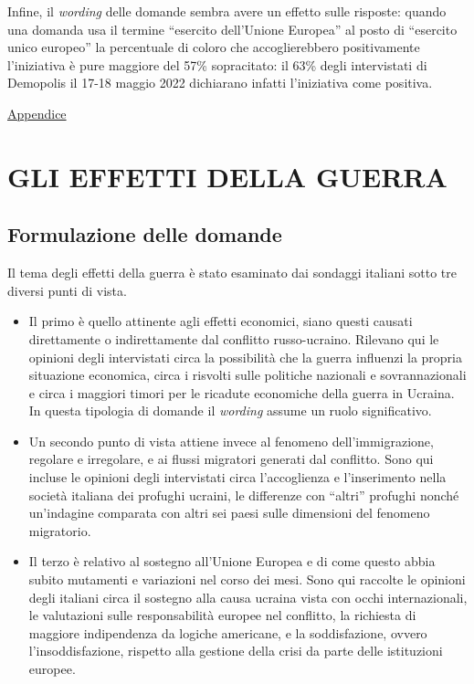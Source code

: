\documentclass[
]{book}
\begin{document}
Infine, il \emph{wording} delle domande sembra avere un effetto sulle risposte: quando una domanda usa il termine ``esercito dell'Unione Europea'' al posto di ``esercito unico europeo'' la percentuale di coloro che accoglierebbero positivamente l'iniziativa è pure maggiore del 57\% sopracitato: il 63\% degli intervistati di Demopolis il 17-18 maggio 2022 dichiarano infatti l'iniziativa come positiva.

\href{https://github.com/LucianaFazio/Ucrania/blob/main/PDF_Appendice/V.\%20Cosa\%20dobbiamo\%20possiamo\%20fare\%20noi\%20v.5.pdf}{Appendice}

\hypertarget{gli-effetti-della-guerra}{%
\chapter{GLI EFFETTI DELLA GUERRA}\label{gli-effetti-della-guerra}}

\hypertarget{formulazione-delle-domande-4}{%
\section{Formulazione delle domande}\label{formulazione-delle-domande-4}}

Il tema degli effetti della guerra è stato esaminato dai sondaggi italiani sotto tre diversi punti di vista.

\begin{itemize}
\item
  Il primo è quello attinente agli effetti economici, siano questi causati direttamente o indirettamente dal conflitto russo-ucraino. Rilevano qui le opinioni degli intervistati circa la possibilità che la guerra influenzi la propria situazione economica, circa i risvolti sulle politiche nazionali e sovrannazionali e circa i maggiori timori per le ricadute economiche della guerra in Ucraina. In questa tipologia di domande il \emph{wording} assume un ruolo significativo.
\item
  Un secondo punto di vista attiene invece al fenomeno dell'immigrazione, regolare e irregolare, e ai flussi migratori generati dal conflitto. Sono qui incluse le opinioni degli intervistati circa l'accoglienza e l'inserimento nella società italiana dei profughi ucraini, le differenze con ``altri'' profughi nonché un'indagine comparata con altri sei paesi sulle dimensioni del fenomeno migratorio.
\item
  Il terzo è relativo al sostegno all'Unione Europea e di come questo abbia subito mutamenti e variazioni nel corso dei mesi. Sono qui raccolte le opinioni degli italiani circa il sostegno alla causa ucraina vista con occhi internazionali, le valutazioni sulle responsabilità europee nel conflitto, la richiesta di maggiore indipendenza da logiche americane, e la soddisfazione, ovvero l'insoddisfazione, rispetto alla gestione della crisi da parte delle istituzioni europee.
\end{itemize}
\end{document}
